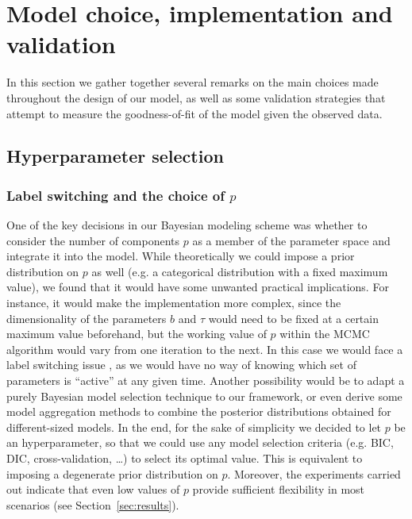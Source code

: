 %
%

\chapter{Model choice, implementation and validation}\label{ch:model-choice}

In this section we gather together several remarks on the main choices made throughout the design of our model, as well as some validation strategies that attempt to measure the goodness-of-fit of the model given the observed data.

\section{Hyperparameter selection}

\subsection*{Label switching and the choice of \(p\)}

One of the key decisions in our Bayesian modeling scheme was whether to consider the number of components \(p\) as a member of the parameter space and integrate it into the model. While theoretically we could impose a prior distribution on \(p\) as well (e.g. a categorical distribution with a fixed maximum value), we found that it would have some unwanted practical implications. For instance, it would make the implementation more complex, since the dimensionality of the parameters \(b\) and \(\tau\) would need to be fixed at a certain maximum value beforehand, but the working value of \(p\) within the MCMC algorithm would vary from one iteration to the next. In this case we would face a label switching issue \citep[c.f.][Sec.~2.3]{grollemund2019bayesian}, as we would have no way of knowing which set of parameters is ``active'' at any given time. Another possibility would be to adapt a purely Bayesian model selection technique \citep[e.g.][Ch.~7]{piironen2017comparison, gelman2013bayesian} to our framework, or even derive some model aggregation methods to combine the posterior distributions obtained for different-sized models. In the end, for the sake of simplicity we decided to let \(p\) be an hyperparameter, so that we could use any model selection criteria (e.g. BIC, DIC, cross-validation, \ldots) to select its optimal value. This is equivalent to imposing a degenerate prior distribution on \(p\). Moreover, the experiments carried out indicate that even low values of \(p\) provide sufficient flexibility in most scenarios (see Section~\ref{sec:results}). 

